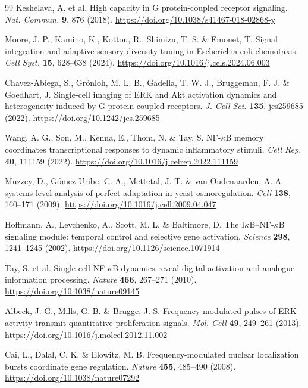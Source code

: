 \documentclass[11pt,a4paper]{article}
\begin{document}
\begin{thebibliography}{99}
Keshelava, A. et al. High capacity in G protein-coupled receptor signaling. \emph{Nat. Commun.} \textbf{9}, 876 (2018). \url{https://doi.org/10.1038/s41467-018-02868-y}

Moore, J. P., Kamino, K., Kottou, R., Shimizu, T. S. \& Emonet, T. Signal integration and adaptive sensory diversity tuning in Escherichia coli chemotaxis. \emph{Cell Syst.} \textbf{15}, 628--638 (2024). \url{https://doi.org/10.1016/j.cels.2024.06.003}

Chavez-Abiega, S., Gr\"onloh, M. L. B., Gadella, T. W. J., Bruggeman, F. J. \& Goedhart, J. Single-cell imaging of ERK and Akt activation dynamics and heterogeneity induced by G-protein-coupled receptors. \emph{J. Cell Sci.} \textbf{135}, jcs259685 (2022). \url{https://doi.org/10.1242/jcs.259685}

Wang, A. G., Son, M., Kenna, E., Thom, N. \& Tay, S. NF-$\kappa$B memory coordinates transcriptional responses to dynamic inflammatory stimuli. \emph{Cell Rep.} \textbf{40}, 111159 (2022). \url{https://doi.org/10.1016/j.celrep.2022.111159}

Muzzey, D., G\'omez-Uribe, C. A., Mettetal, J. T. \& van Oudenaarden, A. A systems-level analysis of perfect adaptation in yeast osmoregulation. \emph{Cell} \textbf{138}, 160--171 (2009). \url{https://doi.org/10.1016/j.cell.2009.04.047}

Hoffmann, A., Levchenko, A., Scott, M. L. \& Baltimore, D. The I$\kappa$B--NF-$\kappa$B signaling module: temporal control and selective gene activation. \emph{Science} \textbf{298}, 1241--1245 (2002). \url{https://doi.org/10.1126/science.1071914}

Tay, S. et al. Single-cell NF-$\kappa$B dynamics reveal digital activation and analogue information processing. \emph{Nature} \textbf{466}, 267--271 (2010). \url{https://doi.org/10.1038/nature09145}

Albeck, J. G., Mills, G. B. \& Brugge, J. S. Frequency-modulated pulses of ERK activity transmit quantitative proliferation signals. \emph{Mol. Cell} \textbf{49}, 249--261 (2013). \url{https://doi.org/10.1016/j.molcel.2012.11.002}

Cai, L., Dalal, C. K. \& Elowitz, M. B. Frequency-modulated nuclear localization bursts coordinate gene regulation. \emph{Nature} \textbf{455}, 485--490 (2008). \url{https://doi.org/10.1038/nature07292}


\end{thebibliography}
\end{document}
